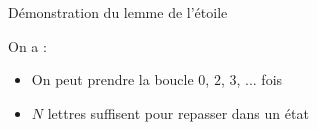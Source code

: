 \begin{frame}{Démonstration du lemme de l'étoile}
  \pause

  \begin{center}\end{center}

  On a :
  \begin{itemize}
  \item On peut prendre la boucle $0$, $2$, $3$, ... fois
  \item $N$ lettres suffisent pour repasser dans un état
  \end{itemize}

  \phantom{.}
\end{frame}


\endgroup
